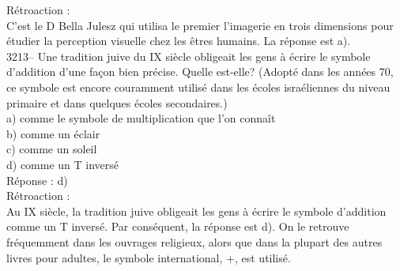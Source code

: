 \documentclass[letterpaper, 12pt]{article}
\begin{document}
R\'etroaction :\\
C'est le D Bella Julesz qui utilisa le premier l'imagerie en trois dimensions pour \'etudier la perception visuelle chez les \^etres humains. La r\'eponse est a).\\



3213-- Une tradition juive du {\scriptsize IX\ieme{}} si\`ecle obligeait les gens \`a \'ecrire le symbole d'addition d'une fa\c con bien pr\'ecise. Quelle est-elle? (Adopt\'e dans les ann\'ees 70, ce symbole est encore couramment utilis\'e dans les \'ecoles isra\'eliennes du niveau primaire et dans quelques \'ecoles secondaires.)\\

a) comme le symbole de multiplication que l'on conna\^it\\
b) comme un \'eclair\\
c) comme un soleil\\
d) comme un T invers\'e\\

R\'eponse : d)\\

R\'etroaction :\\
Au {\scriptsize IX\ieme{}} si\`ecle, la tradition juive obligeait les gens \`a \'ecrire le symbole d'addition comme un T invers\'e. Par cons\'equent, la r\'eponse est d). On le retrouve fr\'equemment dans les ouvrages religieux, alors que dans la plupart des autres livres pour adultes, le symbole international, $+$, est utilis\'e.\\
\end{document}
